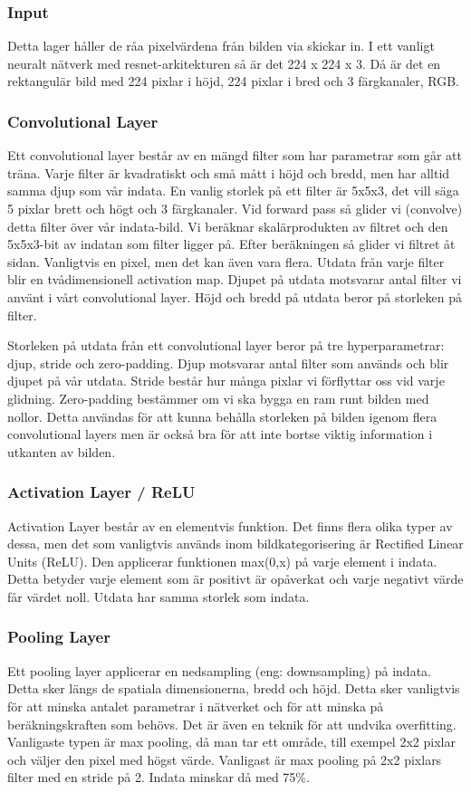 \documentclass[]{kththesis}
\begin{document}
\subsubsection{Input}
Detta lager håller de råa pixelvärdena från bilden via skickar in. I ett vanligt neuralt nätverk med resnet-arkitekturen så är det 224 x 224 x 3. Då är det en rektangulär bild med 224 pixlar i höjd, 224 pixlar i bred och 3 färgkanaler, RGB.

\subsubsection{Convolutional Layer}
Ett convolutional layer består av en mängd filter som har parametrar som går att träna. Varje filter är kvadratiskt och små mått i höjd och bredd, men har alltid samma djup som vår indata. En vanlig storlek på ett filter är 5x5x3, det vill säga 5 pixlar brett och högt och 3 färgkanaler. Vid forward pass så glider vi (convolve) detta filter över vår indata-bild. Vi beräknar skalärprodukten av filtret och den 5x5x3-bit av indatan som filter ligger på. Efter beräkningen så glider vi filtret åt sidan. Vanligtvis en pixel, men det kan även vara flera. Utdata från varje filter blir en tvådimensionell activation map. Djupet på utdata motsvarar antal filter vi använt i vårt convolutional layer. Höjd och bredd på utdata beror på storleken på filter.

Storleken på utdata från ett convolutional layer beror på tre hyperparametrar: djup, stride och zero-padding. Djup motsvarar antal filter som används och blir djupet på vår utdata. Stride består hur många pixlar vi förflyttar oss vid varje glidning. Zero-padding bestämmer om vi ska bygga en ram runt bilden med nollor. Detta användas för att kunna behålla storleken på bilden igenom flera convolutional layers men är också bra för att inte bortse viktig information i utkanten av bilden.

\subsubsection{Activation Layer / ReLU}
Activation Layer består av en elementvis funktion. Det finns flera olika typer av dessa, men det som vanligtvis används inom bildkategorisering är Rectified Linear Units (ReLU). Den applicerar funktionen max(0,x) på varje element i indata. Detta betyder varje element som är positivt är opåverkat och varje negativt värde får värdet noll. Utdata har samma storlek som indata.

\subsubsection{Pooling Layer}
Ett pooling layer applicerar en nedsampling (eng: downsampling) på indata. Detta sker längs de spatiala dimensionerna, bredd och höjd. Detta sker vanligtvis för att minska antalet parametrar i nätverket och för att minska på beräkningskraften som behövs. Det är även en teknik för att undvika overfitting. Vanligaste typen är max pooling, då man tar ett område, till exempel 2x2 pixlar och väljer den pixel med högst värde. Vanligast är max pooling på 2x2 pixlars filter med en stride på 2. Indata minskar då med 75\%.
\end{document}
